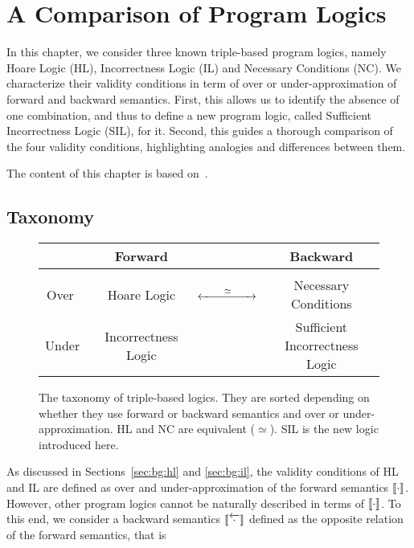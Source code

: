 
\chapter{A Comparison of Program Logics}\label{ch:sil}
In this chapter, we consider three known triple-based program logics, namely Hoare Logic (HL), Incorrectness Logic (IL) and Necessary Conditions (NC). We characterize their validity conditions in term of over or under-approximation of forward and backward semantics. First, this allows us to identify the absence of one combination, and thus to define a new program logic, called Sufficient Incorrectness Logic (SIL), for it. Second, this guides a thorough comparison of the four validity conditions, highlighting analogies and differences between them.

The content of this chapter is based on~\cite{ABGL24}.

\section{Taxonomy}
\begin{figure}[t]
	\centering
	\begin{tabular}{c|ccc}
		                   & Forward                   &                                        & Backward                                            \\[3pt]
		\hline             &                           &                                        &                                                     \\[-5pt]
		\quad Over \quad\  & \quad Hoare Logic         & $\xleftrightarrow{\qquad\simeq\qquad}$ & Necessary Conditions                                \\[5pt]
		\quad Under\quad\  & \quad Incorrectness Logic &                                        & \textcolor{ACMBlue}{Sufficient Incorrectness Logic}
	\end{tabular}
	\caption{The taxonomy of triple-based logics. They are sorted depending on whether they use forward or backward semantics and over or under-approximation. HL and NC are equivalent ($\simeq$). SIL is the new logic introduced here.}
	\label{fig:sil:taxonomy}
\end{figure}

As discussed in Sections~\ref{sec:bg:hl} and \ref{sec:bg:il}, the validity conditions of HL and IL are defined as over and under-approximation of the forward semantics $\llbracket\cdot\rrbracket$. However, other program logics cannot be naturally described in terms of $\llbracket\cdot\rrbracket$. To this end, we consider a backward semantics $\llbracket\overleftarrow{\cdot}\rrbracket$ defined as the opposite relation of the forward semantics, that is

